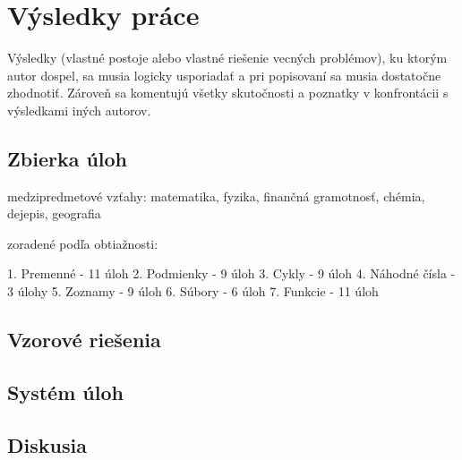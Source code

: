 \chapter{Výsledky práce}


Výsledky (vlastné postoje alebo vlastné riešenie vecných problémov), ku ktorým autor dospel, sa musia logicky usporiadať a pri popisovaní sa musia dostatočne zhodnotiť. Zároveň sa komentujú všetky skutočnosti a poznatky v konfrontácii s výsledkami iných autorov. 

\section{Zbierka úloh}
medzipredmetové vzťahy: matematika, fyzika, finančná gramotnosť, chémia, dejepis, geografia

zoradené podľa obtiažnosti: 

1. Premenné - 11 úloh
2. Podmienky - 9 úloh
3. Cykly - 9 úloh
4. Náhodné čísla - 3 úlohy
5. Zoznamy - 9 úloh
6. Súbory - 6 úloh
7. Funkcie - 11 úloh




%
%
%
%


\section{Vzorové riešenia}




%
%
%
%

\section{Systém úloh}





\section{Diskusia} 

 
